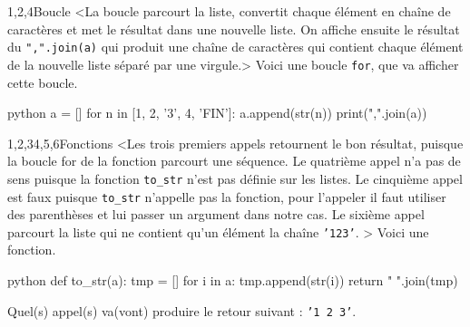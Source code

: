 \begin{quiz}[title={Boucle et fonctions}]
\vspace{-\baselineskip}
\begin{quizquestion}[b]{3}{1,2,4}{Boucle}
<La boucle parcourt la liste, convertit chaque élément en chaîne de caractères et met le résultat dans une nouvelle liste. On affiche ensuite le résultat du \texttt{",".join(a)} qui produit une chaîne de caractères qui contient chaque élément de la nouvelle liste séparé par une virgule.> 
Voici une boucle \texttt{for}, que va afficher cette boucle.
\begin{listingbox}{python}
a = []
for n in [1, 2, '3', 4, 'FIN']:
    a.append(str(n))
print(",".join(a))
\end{listingbox}
\vspace{6pt}
\end{quizquestion}

\begin{quizquestion}[b]{1,2,3}{4,5,6}{Fonctions}
<Les trois premiers appels retournent le bon résultat, puisque la boucle for de la fonction parcourt une séquence.
Le quatrième appel n'a pas de sens puisque la fonction \texttt{to\_str} n'est pas définie sur les listes.
Le cinquième appel est faux puisque \texttt{to\_str} n'appelle pas la fonction, pour l'appeler il faut utiliser des parenthèses et lui passer un argument dans notre cas. Le sixième appel parcourt la liste qui ne contient qu'un élément la chaîne \texttt{'123'}. > 
Voici une fonction.
\begin{listingbox}{python}
def to_str(a):
    tmp = []
    for i in a:
        tmp.append(str(i))
    return " ".join(tmp)
\end{listingbox}
\vspace{6pt}
Quel(s) appel(s) va(vont) produire le retour suivant : \texttt{'1 2 3'}.
\end{quizquestion}
\end{quiz}

